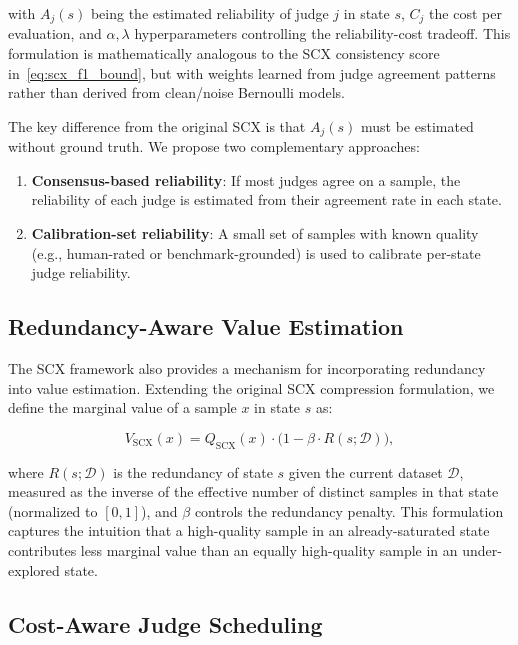 \documentclass[11pt,twocolumn]{article}
\begin{document}
with $A_j(s)$ being the estimated reliability of judge $j$ in state $s$, $C_j$ the cost per evaluation, and $\alpha, \lambda$ hyperparameters controlling the reliability-cost tradeoff. This formulation is mathematically analogous to the SCX consistency score in~\eqref{eq:scx_f1_bound}, but with weights learned from judge agreement patterns rather than derived from clean/noise Bernoulli models.

The key difference from the original SCX is that $A_j(s)$ must be estimated without ground truth. We propose two complementary approaches:
\begin{enumerate}
    \item \textbf{Consensus-based reliability}: If most judges agree on a sample, the reliability of each judge is estimated from their agreement rate in each state.
    \item \textbf{Calibration-set reliability}: A small set of samples with known quality (e.g., human-rated or benchmark-grounded) is used to calibrate per-state judge reliability.
\end{enumerate}

\subsection{Redundancy-Aware Value Estimation}

The SCX framework also provides a mechanism for incorporating redundancy into value estimation. Extending the original SCX compression formulation, we define the marginal value of a sample $x$ in state $s$ as:

\begin{equation}
V_{\text{SCX}}(x) = Q_{\text{SCX}}(x) \cdot \bigl(1 - \beta \cdot R(s; \mathcal{D})\bigr),
\label{eq:scx_marginal_value}
\end{equation}

where $R(s; \mathcal{D})$ is the redundancy of state $s$ given the current dataset $\mathcal{D}$, measured as the inverse of the effective number of distinct samples in that state (normalized to $[0,1]$), and $\beta$ controls the redundancy penalty. This formulation captures the intuition that a high-quality sample in an already-saturated state contributes less marginal value than an equally high-quality sample in an under-explored state.

\subsection{Cost-Aware Judge Scheduling}
\end{document}

